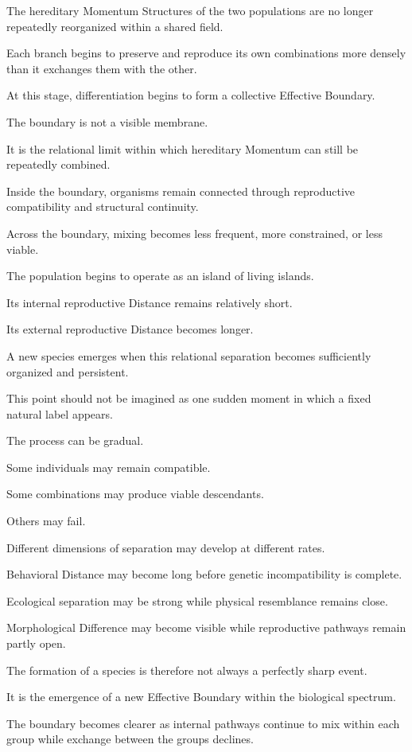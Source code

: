 The hereditary Momentum Structures of the two populations are no longer repeatedly reorganized within a shared field.

Each branch begins to preserve and reproduce its own combinations more densely than it exchanges them with the other.

At this stage, differentiation begins to form a collective Effective Boundary.

The boundary is not a visible membrane.

It is the relational limit within which hereditary Momentum can still be repeatedly combined.

Inside the boundary, organisms remain connected through reproductive compatibility and structural continuity.

Across the boundary, mixing becomes less frequent, more constrained, or less viable.

The population begins to operate as an island of living islands.

Its internal reproductive Distance remains relatively short.

Its external reproductive Distance becomes longer.

A new species emerges when this relational separation becomes sufficiently organized and persistent.

This point should not be imagined as one sudden moment in which a fixed natural label appears.

The process can be gradual.

Some individuals may remain compatible.

Some combinations may produce viable descendants.

Others may fail.

Different dimensions of separation may develop at different rates.

Behavioral Distance may become long before genetic incompatibility is complete.

Ecological separation may be strong while physical resemblance remains close.

Morphological Difference may become visible while reproductive pathways remain partly open.

The formation of a species is therefore not always a perfectly sharp event.

It is the emergence of a new Effective Boundary within the biological spectrum.

The boundary becomes clearer as internal pathways continue to mix within each group while exchange between the groups declines.

